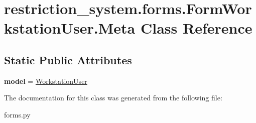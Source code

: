 \hypertarget{classrestriction__system_1_1forms_1_1FormWorkstationUser_1_1Meta}{}\section{restriction\+\_\+system.\+forms.\+Form\+Workstation\+User.\+Meta Class Reference}
\label{classrestriction__system_1_1forms_1_1FormWorkstationUser_1_1Meta}
\subsection*{Static Public Attributes}
\begin{DoxyCompactItemize}
\item 
\hypertarget{classrestriction__system_1_1forms_1_1FormWorkstationUser_1_1Meta_ac8105fea457587dc781a74af4b623f9f}{}{\bfseries model} = \hyperlink{classrestriction__system_1_1models_1_1WorkstationUser}{Workstation\+User}\label{classrestriction__system_1_1forms_1_1FormWorkstationUser_1_1Meta_ac8105fea457587dc781a74af4b623f9f}

\end{DoxyCompactItemize}


The documentation for this class was generated from the following file\+:\begin{DoxyCompactItemize}
\item 
forms.\+py\end{DoxyCompactItemize}
